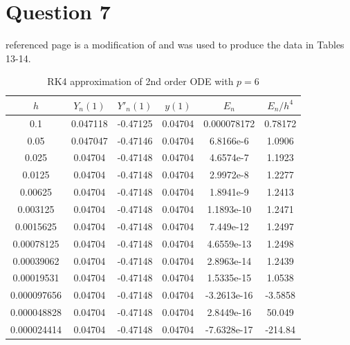 \documentclass[10pt,a4paper,notitlepage]{article}
\begin{document}
\section*{\centering \large Question 7}
 referenced page \pageref{subsec:Code 7.2} is a modification of  and was used to produce the data in Tables 13-14. 
\begin{table}[H]
\centering
\begin{tabular}{|c|c|c|c|c|c|} \hline $h$&$Y_{n}(1)$&$Y'_{n}(1)$&$y(1)$&$E_{n}$&$E_{n}/h^{4}$ \\ \hline 0.1 & 0.047118 & -0.47125 & 0.04704 & 0.000078172 & 0.78172\\ 0.05 & 0.047047 & -0.47146 & 0.04704 & 6.8166e-6 & 1.0906\\ 0.025 & 0.04704 & -0.47148 & 0.04704 & 4.6574e-7 & 1.1923\\ 0.0125 & 0.04704 & -0.47148 & 0.04704 & 2.9972e-8 & 1.2277\\ 0.00625 & 0.04704 & -0.47148 & 0.04704 & 1.8941e-9 & 1.2413\\ 0.003125 & 0.04704 & -0.47148 & 0.04704 & 1.1893e-10 & 1.2471\\ 0.0015625 & 0.04704 & -0.47148 & 0.04704 & 7.449e-12 & 1.2497\\ 0.00078125 & 0.04704 & -0.47148 & 0.04704 & 4.6559e-13 & 1.2498\\ 0.00039062 & 0.04704 & -0.47148 & 0.04704 & 2.8963e-14 & 1.2439\\ 0.00019531 & 0.04704 & -0.47148 & 0.04704 & 1.5335e-15 & 1.0538\\ 0.000097656 & 0.04704 & -0.47148 & 0.04704 & -3.2613e-16 & -3.5858\\ 0.000048828 & 0.04704 & -0.47148 & 0.04704 & 2.8449e-16 & 50.049\\ 0.000024414 & 0.04704 & -0.47148 & 0.04704 & -7.6328e-17 & -214.84
 \\ \hline \end{tabular}
\caption{RK4 approximation of 2nd order ODE with $p=6$}
\label{tab:P=6}
\end{table}
\end{document}
